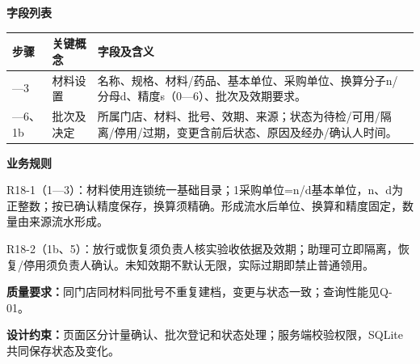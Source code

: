 \documentclass[UTF8,a4paper,zihao=-4,fontset=none]{ctexart}
\begin{document}
\noindent\textbf{字段列表}\par
{\setlength{\tabcolsep}{3pt}\renewcommand{\arraystretch}{1.04}
\noindent\begin{tabular}{@{}>{\raggedright\arraybackslash}p{1.2cm}>{\raggedright\arraybackslash}p{2.2cm}>{\raggedright\arraybackslash}p{12.3cm}@{}}
\toprule
步骤 & 关键概念 & 字段及含义 \\ \midrule
1—3 & 材料设置 & 名称、规格、材料/药品、基本单位、采购单位、换算分子n/分母d、精度s（0—6）、批次及效期要求。 \\
4—6、1b & 批次及决定 & 所属门店、材料、批号、效期、来源；状态为待检/可用/隔离/停用/过期，变更含前后状态、原因及经办/确认人时间。 \\
\bottomrule
\end{tabular}\par}
\smallskip
\noindent\textbf{业务规则}\par
\noindent R18-1（1—3）：材料使用连锁统一基础目录；1采购单位=n/d基本单位，n、d为正整数；按已确认精度保存，换算须精确。形成流水后单位、换算和精度固定，数量由来源流水形成。\par
\noindent R18-2（1b、5）：放行或恢复须负责人核实验收依据及效期；助理可立即隔离，恢复/停用须负责人确认。未知效期不默认无限，实际过期即禁止普通领用。\par
\smallskip
\noindent\textbf{质量要求：}同门店同材料同批号不重复建档，变更与状态一致；查询性能见Q-01。\par
\noindent\textbf{设计约束：}页面区分计量确认、批次登记和状态处理；服务端校验权限，SQLite共同保存状态及变化。\par
\endgroup
\clearpage
\end{document}
